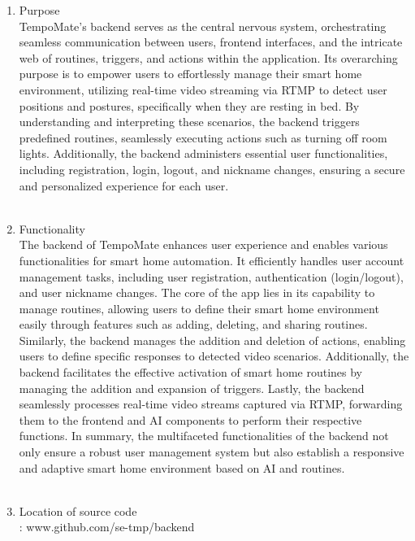 \begin{enumerate}
    \item Purpose \\
          TempoMate's backend serves as the central nervous system, orchestrating seamless communication between users, frontend interfaces, and the intricate web of routines, triggers, and actions within the application. Its overarching purpose is to empower users to effortlessly manage their smart home environment, utilizing real-time video streaming via RTMP to detect user positions and postures, specifically when they are resting in bed. By understanding and interpreting these scenarios, the backend triggers predefined routines, seamlessly executing actions such as turning off room lights. Additionally, the backend administers essential user functionalities, including registration, login, logout, and nickname changes, ensuring a secure and personalized experience for each user. \\\\

    \item Functionality \\
          The backend of TempoMate enhances user experience and enables various functionalities for smart home automation. It efficiently handles user account management tasks, including user registration, authentication (login/logout), and user nickname changes. The core of the app lies in its capability to manage routines, allowing users to define their smart home environment easily through features such as adding, deleting, and sharing routines. Similarly, the backend manages the addition and deletion of actions, enabling users to define specific responses to detected video scenarios. Additionally, the backend facilitates the effective activation of smart home routines by managing the addition and expansion of triggers. Lastly, the backend seamlessly processes real-time video streams captured via RTMP, forwarding them to the frontend and AI components to perform their respective functions. In summary, the multifaceted functionalities of the backend not only ensure a robust user management system but also establish a responsive and adaptive smart home environment based on AI and routines. \\\\

    \item Location of source code \\
          : www.github.com/se-tmp/backend \\\\


\end{enumerate}
